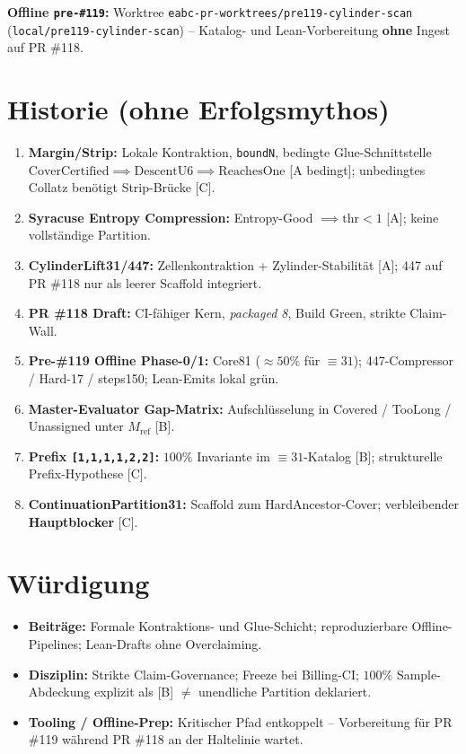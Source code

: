 \documentclass[11pt,a4paper]{article}
\theoremstyle{definition}
\theoremstyle{remark}
\newcommand{\Mref}{M_{\mathrm{ref}}}
\begin{document}
	\noindent\textbf{Offline \texttt{pre-\#119}:} Worktree \texttt{eabc-pr-worktrees/pre119-cylinder-scan} (\texttt{local/pre119-cylinder-scan}) -- Katalog- und Lean-Vorbereitung \textbf{ohne} Ingest auf PR \#118.
	
	\section{Historie (ohne Erfolgsmythos)}
	
	\begin{enumerate}
		\item \textbf{Margin/Strip:} Lokale Kontraktion, \texttt{boundN}, bedingte Glue-Schnittstelle $\mathrm{CoverCertified} \implies \mathrm{DescentU6} \implies \mathrm{ReachesOne}$ [A bedingt]; unbedingtes Collatz benötigt Strip-Brücke [C].
		\item \textbf{Syracuse Entropy Compression:} Entropy-Good $\implies \text{thr} < 1$ [A]; keine vollständige Partition.
		\item \textbf{CylinderLift31/447:} Zellenkontraktion + Zylinder-Stabilität [A]; 447 auf PR \#118 nur als leerer Scaffold integriert.
		\item \textbf{PR \#118 Draft:} CI-fähiger Kern, \textit{packaged 8}, Build Green, strikte Claim-Wall.
		\item \textbf{Pre-\#119 Offline Phase-0/1:} Core81 ($\approx 50\%$ für $\equiv 31$); 447-Compressor / Hard-17 / steps150; Lean-Emits lokal grün.
		\item \textbf{Master-Evaluator Gap-Matrix:} Aufschlüsselung in Covered / TooLong / Unassigned unter $\Mref$ [B].
		\item \textbf{Prefix \texttt{[1,1,1,1,2,2]}:} $100\%$ Invariante im $\equiv 31$-Katalog [B]; strukturelle Prefix-Hypothese [C].
		\item \textbf{ContinuationPartition31:} Scaffold zum HardAncestor-Cover; verbleibender \textbf{Hauptblocker} [C].
	\end{enumerate}
	
	\section{Würdigung}
	
	\begin{itemize}
		\item \textbf{Beiträge:} Formale Kontraktions- und Glue-Schicht; reproduzierbare Offline-Pipelines; Lean-Drafts ohne Overclaiming.
		\item \textbf{Disziplin:} Strikte Claim-Governance; Freeze bei Billing-CI; $100\%$ Sample-Abdeckung explizit als [B] $\neq$ unendliche Partition deklariert.
		\item \textbf{Tooling / Offline-Prep:} Kritischer Pfad entkoppelt -- Vorbereitung für PR \#119 während PR \#118 an der Haltelinie wartet.
	\end{itemize}
	
\end{document}
